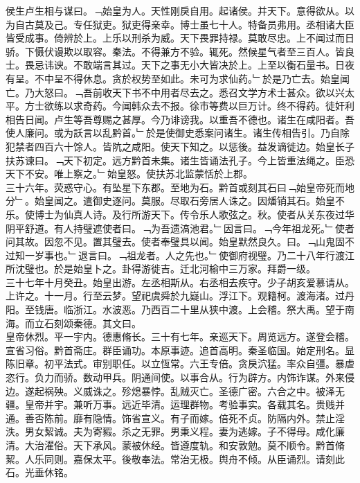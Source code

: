 \documentclass{zhvt-classic}
\begin{document}
\hspace*{2em}侯生卢生相与谋曰。﹁始皇为人。天性刚戾自用。起诸侯。并天下。意得欲从。以为自古莫及己。专任狱吏。狱吏得亲幸。博士虽七十人。特备员弗用。丞相诸大臣皆受成事。倚辨於上。上乐以刑杀为威。天下畏罪持禄。莫敢尽忠。上不闻过而日骄。下慑伏谩欺以取容。秦法。不得兼方不验。辄死。然候星气者至三百人。皆良士。畏忌讳谀。不敢端言其过。天下之事无小大皆决於上。上至以衡石量书。日夜有呈。不中呈不得休息。贪於权势至如此。未可为求仙药。﹂於是乃亡去。始皇闻亡。乃大怒曰。﹁吾前收天下书不中用者尽去之。悉召文学方术士甚众。欲以兴太平。方士欲练以求奇药。今闻韩众去不报。徐巿等费以巨万计。终不得药。徒奸利相告日闻。卢生等吾尊赐之甚厚。今乃诽谤我。以重吾不德也。诸生在咸阳者。吾使人廉问。或为訞言以乱黔首。﹂於是使御史悉案问诸生。诸生传相告引。乃自除犯禁者四百六十馀人。皆阬之咸阳。使天下知之。以惩後。益发谪徙边。始皇长子扶苏谏曰。﹁天下初定。远方黔首未集。诸生皆诵法孔子。今上皆重法绳之。臣恐天下不安。唯上察之。﹂始皇怒。使扶苏北监蒙恬於上郡。\\
\hspace*{2em}三十六年。荧惑守心。有坠星下东郡。至地为石。黔首或刻其石曰﹁始皇帝死而地分﹂。始皇闻之。遣御史逐问。莫服。尽取石旁居人诛之。因燔销其石。始皇不乐。使博士为仙真人诗。及行所游天下。传令乐人歌弦之。秋。使者从关东夜过华阴平舒道。有人持璧遮使者曰。﹁为吾遗滈池君。﹂因言曰。﹁今年祖龙死。﹂使者问其故。因忽不见。置其璧去。使者奉璧具以闻。始皇默然良久。曰。﹁山鬼固不过知一岁事也。﹂退言曰。﹁祖龙者。人之先也。﹂使御府视璧。乃二十八年行渡江所沈璧也。於是始皇卜之。卦得游徙吉。迁北河榆中三万家。拜爵一级。\\
\hspace*{2em}三十七年十月癸丑。始皇出游。左丞相斯从。右丞相去疾守。少子胡亥爱慕请从。上许之。十一月。行至云梦。望祀虞舜於九嶷山。浮江下。观籍柯。渡海渚。过丹阳。至钱唐。临浙江。水波恶。乃西百二十里从狭中渡。上会稽。祭大禹。望于南海。而立石刻颂秦德。其文曰。\\
\hspace*{2em}皇帝休烈。平一宇内。德惠脩长。三十有七年。亲巡天下。周览远方。遂登会稽。宣省习俗。黔首斋庄。群臣诵功。本原事迹。追首高明。秦圣临国。始定刑名。显陈旧章。初平法式。审别职任。以立恆常。六王专倍。贪戾泬猛。率众自彊。暴虐恣行。负力而骄。数动甲兵。阴通间使。以事合从。行为辟方。内饰诈谋。外来侵边。遂起祸殃。义威诛之。殄熄暴悖。乱贼灭亡。圣德广密。六合之中。被泽无疆。皇帝并宇。兼听万事。远近毕清。运理群物。考验事实。各载其名。贵贱并通。善否陈前。靡有隐情。饰省宣义。有子而嫁。倍死不贞。防隔内外。禁止淫泆。男女絜诚。夫为寄豭。杀之无罪。男秉义程。妻为逃嫁。子不得母。咸化廉清。大治濯俗。天下承风。蒙被休经。皆遵度轨。和安敦勉。莫不顺令。黔首脩絜。人乐同则。嘉保太平。後敬奉法。常治无极。舆舟不倾。从臣诵烈。请刻此石。光垂休铭。\\
\end{document}
